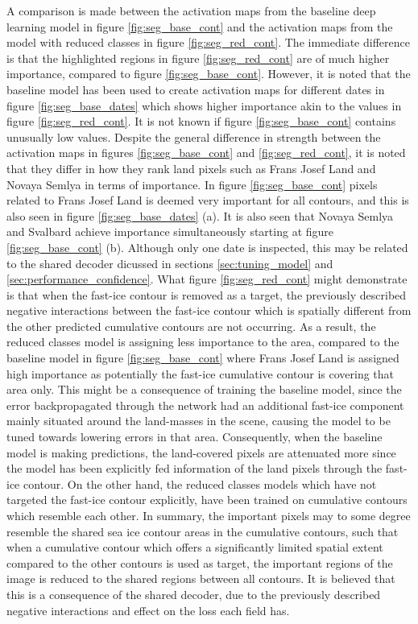 \documentclass[../main/thesis]{subfiles}
\begin{document}
A comparison is made between the activation maps from the baseline deep learning model in figure \ref{fig:seg_base_cont} and the activation maps from the model with reduced classes in figure \ref{fig:seg_red_cont}. The immediate difference is that the highlighted regions in figure \ref{fig:seg_red_cont} are of much higher importance, compared to figure \ref{fig:seg_base_cont}. However, it is noted that the baseline model has been used to create activation maps for different dates in figure \ref{fig:seg_base_dates} which shows higher importance akin to the values in figure \ref{fig:seg_red_cont}. It is not known if figure \ref{fig:seg_base_cont} contains unusually low values. Despite the general difference in strength between the activation maps in figures \ref{fig:seg_base_cont} and \ref{fig:seg_red_cont}, it is noted that they differ in how they rank land pixels such as Frans Josef Land and Novaya Semlya in terms of importance. In figure \ref{fig:seg_base_cont} pixels related to Frans Josef Land is deemed very important for all contours, and this is also seen in figure \ref{fig:seg_base_dates} (a). It is also seen that Novaya Semlya and Svalbard achieve importance simultaneously starting at figure \ref{fig:seg_base_cont} (b). Although only one date is inspected, this may be related to the shared decoder dicussed in sections \ref{sec:tuning_model} and \ref{sec:performance_confidence}. What figure \ref{fig:seg_red_cont} might demonstrate is that when the fast-ice contour is removed as a target, the previously described negative interactions between the fast-ice contour which is spatially different from the other predicted cumulative contours are not occurring. As a result, the reduced classes model is assigning less importance to the area, compared to the baseline model in figure \ref{fig:seg_base_cont} where Frans Josef Land is assigned high importance as potentially the fast-ice cumulative contour is covering that area only. This might be a consequence of training the baseline model, since the error backpropagated through the network had an additional fast-ice component mainly situated around the land-masses in the scene, causing the model to be tuned towards lowering errors in that area. Consequently, when the baseline model is making predictions, the land-covered pixels are attenuated more since the model has been explicitly fed information of the land pixels through the fast-ice contour. On the other hand, the reduced classes models which have not targeted the fast-ice contour explicitly, have been trained on cumulative contours which resemble each other. In summary, the important pixels may to some degree resemble the shared sea ice contour areas in the cumulative contours, such that when a cumulative contour which offers a significantly limited spatial extent compared to the other contours is used as target, the important regions of the image is reduced to the shared regions between all contours. It is believed that this is a consequence of the shared decoder, due to the previously described negative interactions and effect on the loss each field has.
\end{document}
